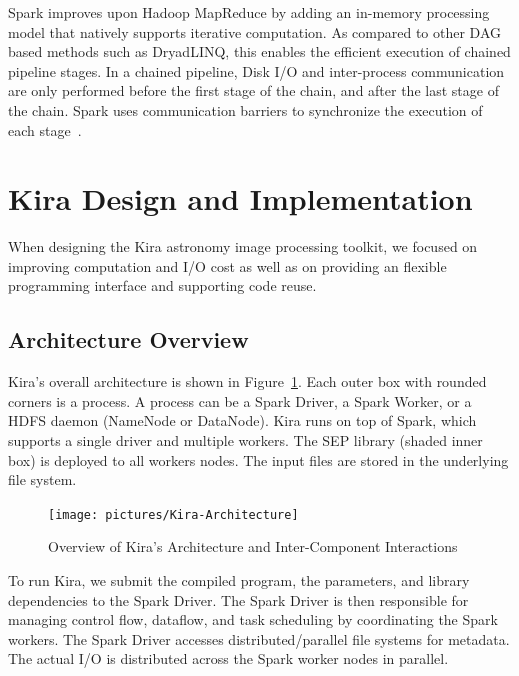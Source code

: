 \documentclass[10pt,journal,compsoc]{IEEEtran}
\begin{document}
Spark improves upon
Hadoop MapReduce by adding an in-memory processing model that natively supports iterative computation. 
As compared to other DAG based methods such as DryadLINQ, this enables
the efficient execution of chained pipeline stages. In a chained pipeline,
Disk I/O and inter-process communication are only performed before the first stage of the chain, and after the
last stage of the chain. Spark uses communication barriers to synchronize the execution of each stage~\cite{zaharia12}.

\section{Kira Design and Implementation}
\label{sec:Design}

When designing the Kira astronomy image processing toolkit, 
we focused on improving computation and  I/O cost as well as on providing an flexible programming interface and supporting code reuse.

\subsection{Architecture Overview}
\label{sec:Design-Overview}

Kira's overall architecture is shown in Figure~\ref{fig:architecture}. 
Each outer box with rounded corners is a process. A process can be
a Spark Driver, a Spark Worker, or a HDFS daemon (NameNode or DataNode).
Kira runs on top of Spark, which supports a single driver and multiple workers.
The SEP library (shaded inner box) is deployed to all workers nodes. 
The input files are stored in the underlying file system.

\begin{figure}[t]
	\begin{center}
		\texttt{[image: pictures/Kira-Architecture]}
		\caption{Overview of Kira's Architecture and Inter-Component Interactions}
		\label{fig:architecture}
  	\end{center}
\end{figure}

To run Kira, we submit the compiled program, the parameters, and library dependencies to the Spark Driver.
The Spark Driver is then responsible for managing control flow, dataflow, and task scheduling 
by coordinating the Spark workers. 
The Spark Driver accesses distributed/parallel file systems for metadata.
The actual I/O is distributed across the Spark worker nodes in parallel. 
\end{document}
